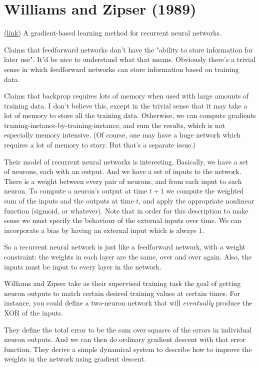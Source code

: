 \documentclass[12pt]{report}
\newcommand{\link}[2]{\href{#1}{#2}}
\begin{document}
\section{Williams and Zipser (1989)}

\link{http://scholar.google.ca/scholar?cluster=1352799553544912946\&hl=en\&as\_sdt=0,5}{(link)}  A gradient-based learning method for recurrent neural networks.
  
Claims that feedforward networks don't have the "ability to store
information for later use".  It'd be nice to understand what that
means.  Obviously there's a trivial sense in which feedforward
networks can store information based on training data.  

Claims that backprop requires lots of memory when used with large
amounts of training data.  I don't believe this, except in the trivial
sense that it may take a lot of memory to store all the training data.
Otherwise, we can compute gradients
training-instance-by-training-instance, and sum the results, which is
not especially memory intensive.  (Of course, one may have a huge
network which requires a lot of memory to story.  But that's a
separate issue.)

Their model of recurrent neural networks is interesting.  Basically,
we have a set of neurons, each with an output.  And we have a set of
inputs to the network.  There is a weight between every pair of
neurons, and from each input to each neuron.  To compute a neuron's
output at time $t+1$ we compute the weighted sum of the inputs and the
outputs at time $t$, and apply the appropriate nonlinear function
(sigmoid, or whatever).  Note that in order for this description to
make sense we must specify the behaviour of the external inputs over
time.  We can incorporate a bias by having an external input which is
always $1$.
  
So a recurrent neural network is just like a feedforward network, with
a weight constraint: the weights in each layer are the same, over and
over again.  Also, the inputs must be input to every layer in the
network.
  
Williams and Zipser take as their supervised training task the goal of
getting neuron outputs to match certain desired training values at
certain times.  For instance, you could define a two-neuron network
that will \emph{eventually} produce the XOR of the inputs.
  
They define the total error to be the sum over squares of the errors
in individual neuron outputs.  And we can then do ordinary gradient
descent with that error function.  They derive a simple dynamical
system to describe how to improve the weights in the network using
gradient descent.
\end{document}

